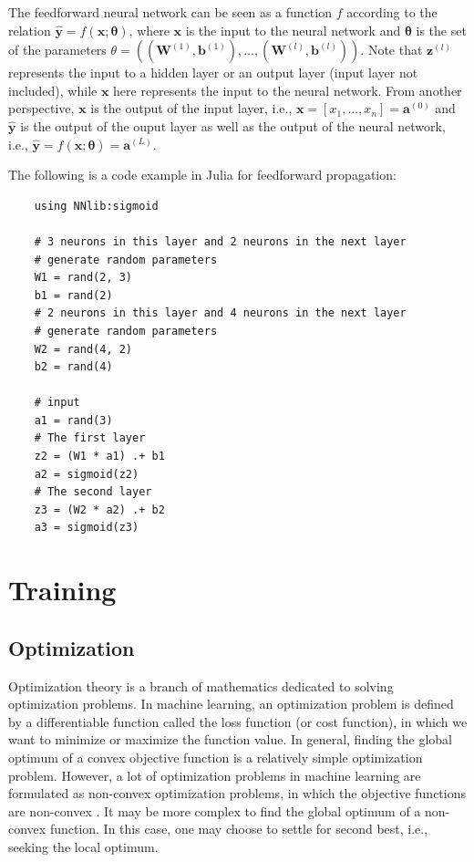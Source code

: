 \documentclass[
	parskip, 			   %
	twoside, 			   %
	DIV=14, 			   %
	BCOR=15.0mm, 		   %
	headsepline, 		   %
	open=right, 		   %
	captions=tableheading, %
	bibliography=totoc,    %
	numbers=noenddot       %
]{scrreprt}
\begin{document}
The feedforward neural network can be seen as a function $f$ according to the relation $\hat{\mathbf{y}} = f(\mathbf{x};\mathbf{\theta})$, where $\mathbf{x}$ is the input to the neural network and $\mathbf{\theta}$ is the set of the parameters $\theta=((\mathbf{W}^{(1)}, \mathbf{b}^{(1)}), ..., (\mathbf{W}^{(l)}, \mathbf{b}^{(l)}))$. Note that $\mathbf{z}^{(l)}$ represents the input to a hidden layer or an output layer (input layer not included), while $\mathbf{x}$ here represents the input to the neural network. From another perspective, $\mathbf{x}$ is the output of the input layer, i.e., $\mathbf{x}=[x_1, ..., x_n]=\mathbf{a}^{(0)}$ and $\hat{\mathbf{y}}$ is the output of the ouput layer as well as the output of the neural network, i.e., $\hat{\mathbf{y}}=f(\mathbf{x};\mathbf{\theta})=\mathbf{a}^{(L)}$. 

The following is a code example in Julia for feedforward propagation:

\begin{verbatim}
    using NNlib:sigmoid

    # 3 neurons in this layer and 2 neurons in the next layer
    # generate random parameters
    W1 = rand(2, 3)
    b1 = rand(2)
    # 2 neurons in this layer and 4 neurons in the next layer
    # generate random parameters
    W2 = rand(4, 2)
    b2 = rand(4)
    
    # input
    a1 = rand(3)
    # The first layer
    z2 = (W1 * a1) .+ b1
    a2 = sigmoid(z2)
    # The second layer
    z3 = (W2 * a2) .+ b2
    a3 = sigmoid(z3)
\end{verbatim}

\section{Training}

\subsection{Optimization}
Optimization theory is a branch of mathematics dedicated to solving optimization problems. In machine learning, an optimization problem is defined by a differentiable function called the loss function (or cost function), in which we want to minimize or maximize the function value. In general, finding the global optimum of a convex objective function is a relatively simple optimization problem. However, a lot of optimization problems in machine learning are formulated as non-convex optimization problems, in which the objective functions are non-convex \cite{sun2019survey}. It may be more complex to find the global optimum of a non-convex function. In this case, one may choose to settle for second best, i.e., seeking the local optimum.
\end{document}
